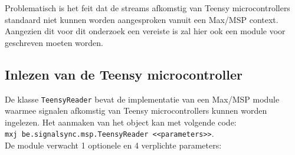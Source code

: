 Problematisch is het feit dat de streams afkomstig van Teensy microcontrollers standaard niet kunnen worden aangesproken vanuit een Max/MSP context. Aangezien dit voor dit onderzoek een vereiste is zal hier ook een module voor geschreven moeten worden.

\subsection{Inlezen van de Teensy microcontroller}
\label{teensy-reader}

De klasse \texttt{TeensyReader} bevat de implementatie van een Max/MSP module waarmee signalen afkomstig van Teensy microcontrollers kunnen worden ingelezen. Het aanmaken van het object kan met volgende code:\\
\mbox{\texttt{mxj\textapprox\ be.signalsync.msp.TeensyReader <<parameters>>}}.\\De module verwacht 1 optionele en 4 verplichte parameters:

